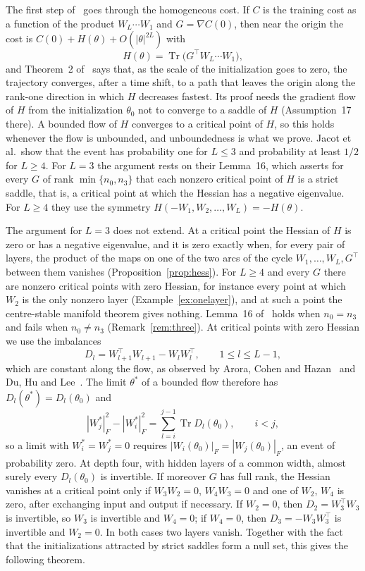\documentclass[11pt]{amsart}
\theoremstyle{definition}
\theoremstyle{remark}
\numberwithin{equation}{section}
\DeclareMathOperator{\Tr}{Tr}
\begin{document}
The first step of~\cite{JGSHG} goes through the homogeneous cost. If $C$ is the training cost as a function of the product $W_L\cdots W_1$ and $G=\nabla C(0)$, then near the origin the cost is $C(0)+H(\theta)+O(|\theta|^{2L})$ with
\[
H(\theta)=\Tr\bigl(G^\top W_L\cdots W_1\bigr),
\]
and Theorem~2 of~\cite{JGSHG} says that, as the scale of the initialization goes to zero, the trajectory converges, after a time shift, to a path that leaves the origin along the rank-one direction in which $H$ decreases fastest. Its proof needs the gradient flow of $H$ from the initialization $\theta_0$ not to converge to a saddle of $H$ (Assumption~17 there). A bounded flow of $H$ converges to a critical point of $H$, so this holds whenever the flow is unbounded, and unboundedness is what we prove. Jacot et al.\ show that the event has probability one for $L\le3$ and probability at least $1/2$ for $L\ge4$. For $L=3$ the argument rests on their Lemma~16, which asserts for every $G$ of rank $\min\{n_0,n_3\}$ that each nonzero critical point of $H$ is a strict saddle, that is, a critical point at which the Hessian has a negative eigenvalue. For $L\ge4$ they use the symmetry $H(-W_1,W_2,\dots,W_L)=-H(\theta)$.

The argument for $L=3$ does not extend. At a critical point the Hessian of $H$ is zero or has a negative eigenvalue, and it is zero exactly when, for every pair of layers, the product of the maps on one of the two arcs of the cycle $W_1,\dots,W_L,G^\top$ between them vanishes (Proposition~\ref{prop:hess}). For $L\ge4$ and every $G$ there are nonzero critical points with zero Hessian, for instance every point at which $W_2$ is the only nonzero layer (Example~\ref{ex:onelayer}), and at such a point the centre-stable manifold theorem gives nothing. Lemma~16 of~\cite{JGSHG} holds when $n_0=n_3$ and fails when $n_0\ne n_3$ (Remark~\ref{rem:three}). At critical points with zero Hessian we use the imbalances
\[
D_l=W_{l+1}^\top W_{l+1}-W_lW_l^\top,\qquad 1\le l\le L-1,
\]
which are constant along the flow, as observed by Arora, Cohen and Hazan~\cite{ACH} and Du, Hu and Lee~\cite{DHL}. The limit $\theta^*$ of a bounded flow therefore has $D_l(\theta^*)=D_l(\theta_0)$ and
\[
|W_j^*|_F^2-|W_i^*|_F^2=\sum_{l=i}^{j-1}\Tr D_l(\theta_0),\qquad i<j,
\]
so a limit with $W_i^*=W_j^*=0$ requires $|W_i(\theta_0)|_F=|W_j(\theta_0)|_F$, an event of probability zero. At depth four, with hidden layers of a common width, almost surely every $D_l(\theta_0)$ is invertible. If moreover $G$ has full rank, the Hessian vanishes at a critical point only if $W_3W_2=0$, $W_4W_3=0$ and one of $W_2$, $W_4$ is zero, after exchanging input and output if necessary. If $W_2=0$, then $D_2=W_3^\top W_3$ is invertible, so $W_3$ is invertible and $W_4=0$; if $W_4=0$, then $D_3=-W_3W_3^\top$ is invertible and $W_2=0$. In both cases two layers vanish. Together with the fact that the initializations attracted by strict saddles form a null set, this gives the following theorem.
\end{document}
